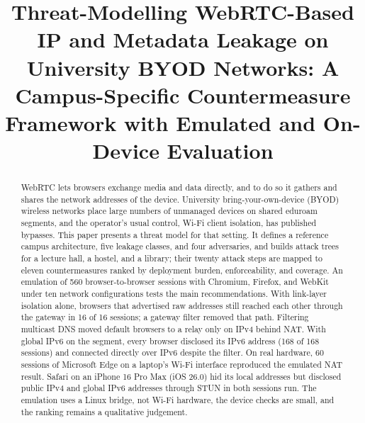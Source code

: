 \documentclass[conference]{IEEEtran}
\begin{document}
\title{Threat-Modelling WebRTC-Based IP and Metadata Leakage on University BYOD Networks: A Campus-Specific Countermeasure Framework with Emulated and On-Device Evaluation}

\author{
\and
{}
\and
{}
}

\maketitle

\begin{abstract}
WebRTC lets browsers exchange media and data directly, and to do so it gathers and shares the network addresses of the device. University bring-your-own-device (BYOD) wireless networks place large numbers of unmanaged devices on shared eduroam segments, and the operator's usual control, Wi-Fi client isolation, has published bypasses. This paper presents a threat model for that setting. It defines a reference campus architecture, five leakage classes, and four adversaries, and builds attack trees for a lecture hall, a hostel, and a library; their twenty attack steps are mapped to eleven countermeasures ranked by deployment burden, enforceability, and coverage. An emulation of 560 browser-to-browser sessions with Chromium, Firefox, and WebKit under ten network configurations tests the main recommendations. With link-layer isolation alone, browsers that advertised raw addresses still reached each other through the gateway in 16 of 16 sessions; a gateway filter removed that path. Filtering multicast DNS moved default browsers to a relay only on IPv4 behind NAT. With global IPv6 on the segment, every browser disclosed its IPv6 address (168 of 168 sessions) and connected directly over IPv6 despite the filter. On real hardware, 60 sessions of Microsoft Edge on a laptop's Wi-Fi interface reproduced the emulated NAT result. Safari on an iPhone 16 Pro Max (iOS 26.0) hid its local addresses but disclosed public IPv4 and global IPv6 addresses through STUN in both sessions run. The emulation uses a Linux bridge, not Wi-Fi hardware, the device checks are small, and the ranking remains a qualitative judgement.
\end{abstract}
\end{document}
